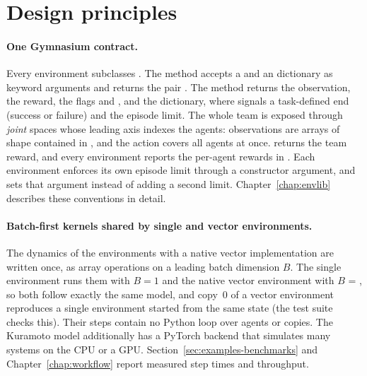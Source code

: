 \section{Design principles}\label{sec:intro-principles}

\paragraph{One Gymnasium contract.}
Every environment subclasses . The method 
accepts a  and an  dictionary as keyword arguments
and returns the pair . The method 
returns the observation, the reward, the flags  and
, and the  dictionary, where 
signals a task-defined end (success or failure) and  the
episode limit. The whole team is exposed through \emph{joint} spaces whose
leading axis indexes the agents: observations are  arrays of
shape  contained in , and
the action covers all agents at once.  returns the team reward, and
every environment reports the per-agent rewards in
. Each environment enforces its own episode limit
through a constructor argument, and  sets that argument instead of adding a second limit.
Chapter~\ref{chap:envlib} describes these conventions in detail.

\paragraph{Batch-first kernels shared by single and vector environments.}
The dynamics of the environments with a native vector implementation are
written once, as array operations on a leading batch dimension $B$. The single
environment runs them with $B = 1$ and the native vector environment with
$B$ = , so both follow exactly the same model, and copy~0 of a
vector environment reproduces a single environment started from the same state
(the test suite checks this). Their steps contain no Python loop over agents or
copies. The Kuramoto model additionally has a PyTorch backend that simulates many systems
on the CPU or a GPU. Section~\ref{sec:examples-benchmarks} and
Chapter~\ref{chap:workflow} report measured step times and throughput.

